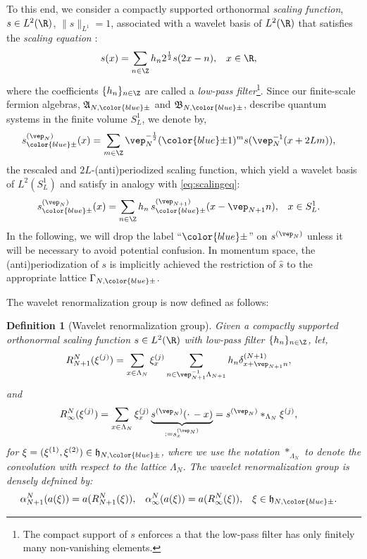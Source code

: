 \documentclass[a4paper, 11pt]{article}
\newcommand{\fA}{\mathfrak{A}}\newcommand{\cA}{\mathcal{A}}\newcommand{\dA}{\mathds{A}}\newcommand{\sA}{\mathscr{A}}
\newcommand{\fB}{\mathfrak{B}}\newcommand{\cB}{\mathcal{B}}\newcommand{\dB}{\mathds{B}}\newcommand{\sB}{\mathscr{B}}
\newcommand{\fh}{\mathfrak{h}}
\DeclareMathOperator{\1}{\mathds{1}}
\newtheorem{defn}[thm]{Definition}
\begin{document}
To this end, we consider a compactly supported orthonormal \textit{scaling function}, $s\in L^{2}(\R)$, $\|s\|_{L^{1}}=1$, associated with a wavelet basis of $L^{2}(\R)$ that satisfies the \textit{scaling equation} \cite{DaubechiesTenLecturesOn, MeyerWaveletsAndOperators}:
\begin{align}
\label{eq:scalingeq}
s(x) & = \sum_{n\in\Z}h_{n} 2^{\frac{1}{2}}s(2x-n), & x & \in\R,
\end{align}
where the coefficients $\{h_{n}\}_{n\in\Z}$ are called a \textit{low-pass filter}\footnote{The compact support of $s$ enforces a that the low-pass filter has only finitely many non-vanishing elements.}. Since our finite-scale fermion algebras, $\fA_{N,{\color{blue}\pm}}$ and $\fB_{N,{\color{blue}\pm}}$, describe quantum systems in the finite volume $S^{1}_{L}$, we denote by,
\begin{align}
\label{eq:rescaledsf}
s^{(\vep_{N})}_{{\color{blue}\pm}}(x) & = \sum_{m\in\Z}\vep_{N}^{-\frac{1}{2}}({\color{blue}\pm}1)^{m}s(\vep_{N}^{-1}(x+2Lm)),
\end{align}
the rescaled and $2L$-(anti)periodized scaling function, which yield a wavelet basis of $L^{2}(S^{1}_{L})$ and satisfy in analogy with \eqref{eq:scalingeq}:
\begin{align}
\label{eq:scalingeqre}
s^{(\vep_{N})}_{{\color{blue}\pm}}(x) & = \sum_{n\in\Z}h_{n}\, s^{(\vep_{N+1})}_{{\color{blue}\pm}}(x-\vep_{N+1}n), & x & \in S^{1}_{L}.
\end{align}
In the following, we will drop the label ``${\color{blue}\pm}$'' on $s^{(\vep_{N})}$ unless it will be necessary to avoid potential confusion. In momentum space, the (anti)periodization of $s$ is implicitly achieved the restriction of $\hat{s}$ to the appropriate lattice $\Gamma_{N,{\color{blue}\pm}}$.

The wavelet renormalization group is now defined as follows:

\begin{defn}[Wavelet renormalization group]
\label{def:waveletrg}
Given a compactly supported orthonormal scaling function $s\in L^{2}(\R)$ with low-pass filter $\{h_{n}\}_{n\in\Z}$, let,
\begin{align}
\label{eq:waveletrg1p}
R^{N}_{N+1}(\xi^{(j)}) & = \sum_{x\in\Lambda_{N}}\xi^{(j)}_{x}\sum_{n\in\vep_{N+1}^{-1}\Lambda_{N+1}}h_{n}\delta^{(N+1)}_{x+\vep_{N+1}n},
\end{align}
and
\begin{align}
\label{eq:waveletrg1pinf}
R^{N}_{\infty}(\xi^{(j)}) & = \sum_{x\in\Lambda_{N}}\xi^{(j)}_{x}\underbrace{s^{(\vep_{N})}(\cdot\!\ -x)}_{:=s^{(\vep_{N})}_{x}} = s^{(\vep_{N})}\ast_{\Lambda_{N}}\xi^{(j)},
\end{align}
for $\xi=(\xi^{(1)},\xi^{(2)})\in\fh_{N,{\color{blue}\pm}}$, where we use the notation $\ast_{\Lambda_{N}}$ to denote the convolution with respect to the lattice $\Lambda_{N}$. The \emph{wavelet renormalization group} is densely defnined by:
\begin{align}
\label{eq:waveletrg}
\alpha^{N}_{N+1}(a(\xi)) & = a(R^{N}_{N+1}(\xi)), & \alpha^{N}_{\infty}(a(\xi)) & = a(R^{N}_{\infty}(\xi)), & \xi & \in\fh_{N,{\color{blue}\pm}}.
\end{align}
\end{defn}
\end{document}
